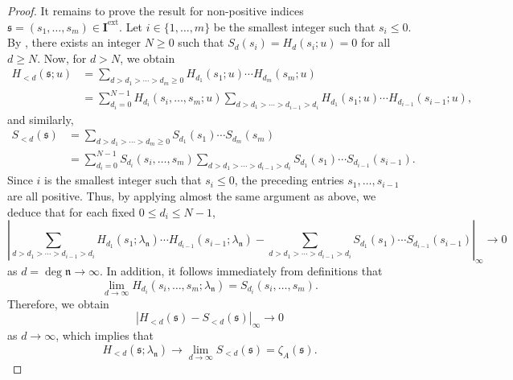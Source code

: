 \documentclass[12pt,reqno]{amsart}
\numberwithin{equation}{section}
\theoremstyle{plain}
\theoremstyle{definition}
\theoremstyle{remark}
\newcommand{\nfk}{\mathfrak{n}}
\newcommand{\ww}[1]{\mathfrak{#1}}
\newcommand{\Ical}{\mathbf{I}}
\newcommand{\ext}{\mathrm{ext}}
\begin{document}
\begin{proof}
 It remains to prove the result for non-positive indices $\ww{s}=(s_1,\ldots,s_m)\in\Ical^{\ext}$. Let $i \in \{1, \ldots, m\}$ be the smallest integer such that $s_i\leq 0$. By \cite[Theorem 5.1.2]{Thakur2004}, there exists an integer $N\geq 0$ such that $S_d(s_i)=H_d(s_i; u)=0$ for all $d \geq N$. Now, for $d>N$, we obtain
\begin{align*}
    H_{<d}(\ww{s};u)&=\sum_{d>d_1>\cdots>d_m\geq 0}H_{d_1}(s_1;u)\cdots H_{d_m}(s_m;u)\\
    &=\sum_{d_i=0}^{N-1}H_{d_i}(s_i,\ldots,s_m;u)\sum_{d>d_1>\cdots>d_{i-1}>d_i}H_{d_1}(s_1;u)\cdots H_{d_{i-1}}(s_{i-1};u),
\end{align*}
and similarly,
\begin{align*}
    S_{<d}(\ww{s})&=\sum_{d>d_1>\cdots>d_m\geq 0}S_{d_1}(s_1)\cdots S_{d_m}(s_m)\\
    &=\sum_{d_i=0}^{N-1}S_{d_i}(s_i,\ldots,s_m) \sum_{d>d_1>\cdots>d_{i-1}>d_i}S_{d_1}(s_1)\cdots S_{d_{i-1}}(s_{i-1}).
\end{align*}
Since $i$ is the smallest integer such that $s_i\leq 0$, the preceding entries $s_1,\ldots,s_{i-1}$ are all positive. Thus, by applying almost the same argument as above, we deduce that for each fixed $0\leq d_i\leq N-1$,
$$\left|\sum_{d>d_1>\cdots>d_{i-1}>d_i}H_{d_1}(s_1;\lambda_\nfk)\cdots H_{d_{i-1}}(s_{i-1};\lambda_\nfk)-\sum_{d>d_1>\cdots>d_{i-1}>d_i}S_{d_1}(s_1)\cdots S_{d_{i-1}}(s_{i-1})\right|_\infty\to 0$$
as $d=\deg\nfk \to \infty$. In addition, it follows immediately from definitions that 
$$\lim_{d\to\infty}H_{d_i}(s_i,\ldots,s_m;\lambda_\nfk)=S_{d_i}(s_i,\ldots,s_m).$$
Therefore, we obtain 
$$|H_{<d}(\ww{s})-S_{<d}(\ww{s})|_\infty\to 0$$
as $d\to\infty$, which implies that 
$$H_{<d}(\ww{s};\lambda_\nfk)\to \lim_{d\to\infty}S_{<d}(\ww{s})=\zeta_A(\ww{s}).$$
\end{proof}
\end{document}

